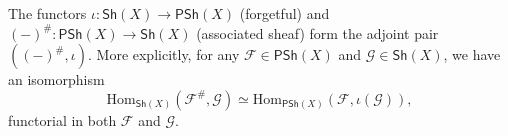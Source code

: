 \documentclass[../Main]{subfiles}
\begin{document}
\begin{rem}[Adjunction]
	The functors
	$\iota\colon \mathsf{Sh}\left(X\right) \to \mathsf{PSh}\left(X\right)$ (forgetful)
	and $\left( - \right)^\#\colon \mathsf{PSh}\left( X \right)  \to \mathsf{Sh}\left(X\right)$
	(associated sheaf)
	form the adjoint pair $(\left( - \right)^\#, \iota )$.
	More explicitly, for any $\mathcal{F} \in \mathsf{PSh}\left( X \right)$
	and $\mathcal{G} \in \mathsf{Sh}\left(X\right)$,
	we have an isomorphism
	\begin{equation}
		\mathrm{Hom}_{\mathsf{Sh}(X)} \left( \mathcal{F}^\#, \mathcal{G} \right) \simeq
	\mathrm{Hom}_{\mathsf{PSh}(X)} \left( \mathcal{F}, \iota(\mathcal{G}) \right)
	,\end{equation} 
	functorial in both $\mathcal{F}$ and $\mathcal{G}$.
\end{rem}
\end{document}
